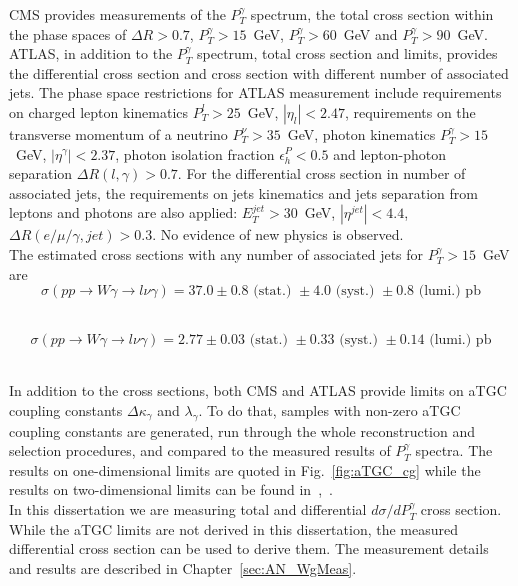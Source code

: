 CMS provides measurements of the $P_T^\gamma$ spectrum, the total cross section within the phase spaces of $\Delta R>0.7$, $P_T^\gamma>15$~GeV, $P_T^\gamma>60$~GeV and $P_T^\gamma>90$~GeV.\\

ATLAS, in addition to the $P_T^\gamma$ spectrum, total cross section and limits, provides the differential cross section and cross section with different number of associated jets. The phase space restrictions for ATLAS measurement include requirements on charged lepton kinematics $P_T^l>25$~GeV, $|\eta_l|<2.47$, requirements on the transverse momentum of a neutrino $P_T^\nu>35$~GeV, photon kinematics $P_T^\gamma>15$~GeV, $|\eta^\gamma|<2.37$, photon isolation fraction $\epsilon^P_h<0.5$ and lepton-photon separation $\Delta R(l,\gamma)>0.7$. For the differential cross section in number of associated jets, the requirements on jets kinematics and jets separation from leptons and photons are also applied: $E_T^{jet}>30$~GeV, $|\eta^{jet}|<4.4$, $\Delta R(e/\mu/\gamma,jet)>0.3$. No evidence of new physics is observed.\\

The estimated cross sections with any number of associated jets for $P_T^\gamma>15$~GeV are \\

\begin{equation}
\sigma(pp\rightarrow W\gamma\rightarrow l\nu\gamma) = 37.0 \pm 0.8\text{~(stat.)~}\pm 4.0\text{~(syst.)~}\pm 0.8\text{~(lumi.)~pb}
\end{equation}

 \\

\begin{equation}
\sigma(pp\rightarrow W\gamma\rightarrow l\nu\gamma) = 2.77 \pm 0.03\text{~(stat.)~}\pm 0.33\text{~(syst.)~}\pm 0.14\text{~(lumi.)~pb}
\end{equation}

\\

In addition to the cross sections, both CMS and ATLAS provide limits on aTGC coupling constants $\Delta \kappa_\gamma$ and $\lambda_\gamma$. To do that, samples with non-zero aTGC coupling constants are generated, run through the whole reconstruction and selection procedures, and compared to the measured results of $P_T^\gamma$ spectra. The results on one-dimensional limits are quoted in Fig.~\ref{fig:aTGC_cg} while the results on two-dimensional limits can be found in~\cite{ref_7TeV_ATLAS},~\cite{ref_7TeV_CMS}.\\

In this dissertation we are measuring total and differential $d\sigma/d P_T^\gamma$ cross section. While the aTGC limits are not derived in this dissertation, the measured differential cross section can be used to derive them. The measurement details and results are described in Chapter~\ref{sec:AN_WgMeas}.\\
